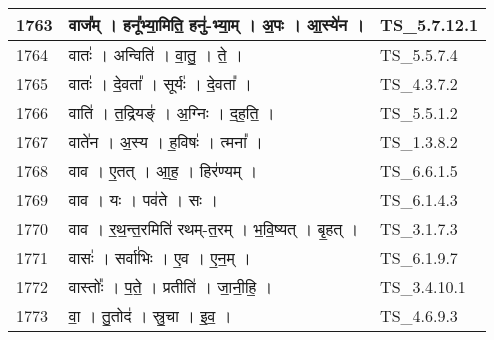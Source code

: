 \documentclass[17pt]{extarticle}
\begin{document}
\begin{longtable}{||p{0.4in}||p{4.9in}||p{0.9in}||}
    \hline
        
    1763 & वाज᳚म्   ।   हनू᳚भ्या॒मिति॒ हनु॑{-}भ्या॒म्   ।   अ॒पः   ।   आ॒स्ये॑न   ।    & TS\_5.7.12.1       \\
    
    \hline
        
    1764 & वातः॑   ।   अन्विति॑   ।   वा॒तु॒   ।   ते॒   ।    & TS\_5.5.7.4       \\
    
    \hline
        
    1765 & वातः॑   ।   दे॒वता᳚   ।   सूर्यः॑   ।   दे॒वता᳚   ।    & TS\_4.3.7.2       \\
    
    \hline
        
    1766 & वाति॑   ।   त॒द्रियङ्॑   ।   अ॒ग्निः   ।   द॒ह॒ति॒   ।    & TS\_5.5.1.2       \\
    
    \hline
        
    1767 & वाते॑न   ।   अ॒स्य   ।   ह॒विषः॑   ।   त्मना᳚   ।    & TS\_1.3.8.2       \\
    
    \hline
        
    1768 & वाव   ।   ए॒तत्   ।   आ॒ह॒   ।   हिर॑ण्यम्   ।    & TS\_6.6.1.5       \\
    
    \hline
        
    1769 & वाव   ।   यः   ।   पव॑ते   ।   सः   ।    & TS\_6.1.4.3       \\
    
    \hline
        
    1770 & वाव   ।   र॒थ॒न्त॒रमिति॑ रथम्{-}त॒रम्   ।   भ॒वि॒ष्यत्   ।   बृ॒हत्   ।    & TS\_3.1.7.3       \\
    
    \hline
        
    1771 & वासः॑   ।   सर्वा॑भिः   ।   ए॒व   ।   ए॒न॒म्   ।    & TS\_6.1.9.7       \\
    
    \hline
        
    1772 & वास्तोः᳚   ।   प॒ते॒   ।   प्रतीति॑   ।   जा॒नी॒हि॒   ।    & TS\_3.4.10.1       \\
    
    \hline
        
    1773 & वा॒   ।   तु॒तोद॑   ।   स्रु॒चा   ।   इ॒व॒   ।    & TS\_4.6.9.3       \\
    
    \hline
        

\end{longtable}
\end{document}
